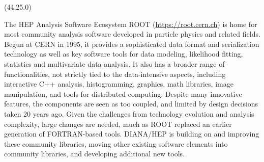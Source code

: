 \documentclass[final]{beamer}
\begin{document}
\begin{frame}{}
\begin{textblock}{38.0}(44,25.0)
\begin{block}{The HEP Analysis Software Ecosystem}
ROOT (\url{https://root.cern.ch}) is
home for most community analysis
software developed in particle physics and related fields. Begun at CERN in 1995,
it provides a sophisticated data format and serialization technology
as well as key software tools for
data modeling, likelihood fitting, statistics and
multivariate data analysis. It also has a broader range of
functionalities, not strictly tied to the data-intensive aspects,
including interactive C++ analysis, histogramming,
graphics, math libraries, image manipulation,
and tools for distributed computing. Despite many
innovative features, the components are seen as too coupled,
and limited by design decisions taken 20 years ago.
Given the challenges from technology evolution and analysis complexity,
large changes are needed,
much as ROOT replaced an earlier generation of
FORTRAN-based tools.
DIANA/HEP is building on and improving these
community libraries, moving other existing software elements into
community libraries, and developing additional new tools.
\end{block}
\end{textblock}




\end{frame}
\end{document}
